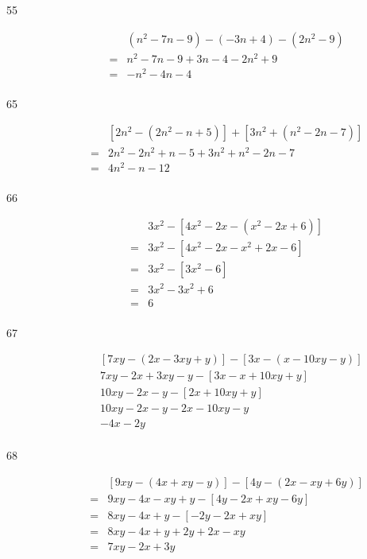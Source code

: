 \documentclass[fleqn,addpoints]{exam}
\begin{document}
\begin{description}
\item[55]
\begin{eqnarray*}
&& (n^2 - 7n - 9) - (-3n + 4) - (2n^2 - 9) \\
&=&  n^2 - 7n - 9 + 3n - 4 - 2n^2 + 9 \\
&=& -n^2 -4n -4 \\
\end{eqnarray*}

\item[65]
\begin{eqnarray*}
&& [2n^2 - (2n^2 - n + 5)] + [3n^2 + (n^2 - 2n - 7)] \\
&=& 2n^2 -2n^2 + n - 5 + 3n^2 + n^2 - 2n - 7 \\
&=& 4n^2 - n - 12 \\
\end{eqnarray*}

\item[66]
\begin{eqnarray*}
&& 3x^2 - [4x^2 - 2x - (x^2 - 2x + 6)] \\
&=& 3x^2 - [4x^2 - 2x - x^2 + 2x - 6] \\
&=& 3x^2 - [3x^2 - 6] \\
&=& 3x^2 - 3x^2 + 6 \\
&=& 6 \\
\end{eqnarray*}

\item[67]
\begin{eqnarray*}
&& [7xy - (2x - 3xy + y)] - [3x - (x - 10xy - y)] \\
&& 7xy - 2x + 3xy - y - [3x - x + 10xy + y] \\
&& 10xy - 2x - y - [2x + 10xy + y] \\
&& 10xy - 2x - y - 2x - 10xy - y \\
&& -4x - 2y \\
\end{eqnarray*}

\item[68]
\begin{eqnarray*}
&& [9xy - (4x + xy - y)] - [4y - (2x - xy + 6y)] \\
&=& 9xy - 4x - xy + y - [4y - 2x + xy - 6y] \\
&=& 8xy - 4x + y - [-2y - 2x + xy] \\
&=& 8xy - 4x + y + 2y + 2x - xy \\
&=& 7xy - 2x + 3y \\
\end{eqnarray*}


\end{description}
\end{document}
